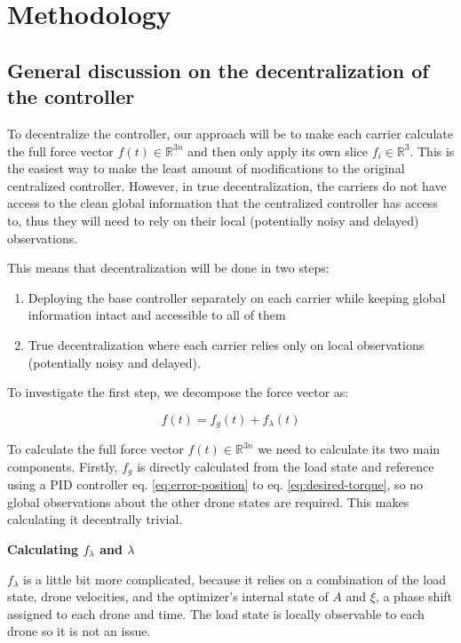 \chapter{Methodology}

\section{General discussion on the decentralization of the controller}

To decentralize the controller, our approach will be to make each carrier
calculate the full force vector \(f(t) \in \mathbb{R}^{3n}\) and then
only apply its own slice \(f_i \in \mathbb{R}^3\). This is the easiest
way to make the least amount of modifications to the original
centralized controller. However, in true decentralization, the carriers
do not have access to the clean global information that the centralized
controller has access to, thus they will need to rely on their local
(potentially noisy and delayed) observations.

This means that decentralization will be done in two steps:

\begin{enumerate}
  \item Deploying the base controller separately on each carrier while
  keeping global information intact and accessible to all of them
  \item True decentralization where each carrier relies only on local
  observations (potentially noisy and delayed).
\end{enumerate}

To investigate the first step, we decompose the force vector as:

\begin{equation}
  f(t) = f_g(t) + f_\lambda(t)
  \label{eq:decentralized-force}
\end{equation}

To calculate the full force vector \(f(t) \in \mathbb{R}^{3n}\) we
need to calculate its two main components. Firstly, $f_g$ is directly
calculated from the load state and reference using a PID controller eq.
\eqref{eq:error-position} to eq. \eqref{eq:desired-torque}, so no
global observations about the other drone states are required. This
makes calculating it decentrally trivial.

\noindent\textbf{Calculating $f_\lambda$ and $\lambda$}

$f_\lambda$ is a little bit more complicated, because it relies on a
combination of the load state, drone velocities, and the optimizer’s
internal state of $A$ and $\xi$, a phase shift assigned to each drone
and time. The load state is locally observable to each drone so it is
not an issue.

